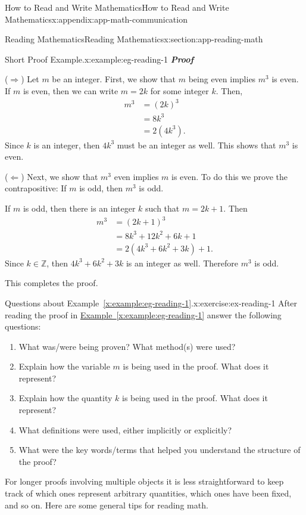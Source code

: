 \documentclass[oneside,10pt,]{book}
\newcommand{\xreffont}{\relax}
\newcommand{\alert}[1]{\textbf{\textit{#1}}}
\numberwithin{equation}{section}
\newcommand{\amp}{&}
\begin{document}
\begin{appendixptx}{How to Read and Write Mathematics}{}{How to Read and Write Mathematics}{}{}{x:appendix:app-math-communication}
\begin{sectionptx}{Reading Mathematics}{}{Reading Mathematics}{}{}{x:section:app-reading-math}
\begin{example}{Short Proof Example.}{x:example:eg-reading-1}
\alert{Proof}%
\par
(\(\Rightarrow\)) Let \(m\) be an integer. First, we show that \(m\) being even implies \(m^3\) is even. If \(m\) is even, then we can write \(m = 2k\) for some integer \(k\). Then,%
\begin{align*}
m^3 \amp = (2k)^3\\
\amp = 8k^3\\
\amp = 2(4k^3)\text{.}
\end{align*}
Since \(k\) is an integer, then \(4k^3\) must be an integer as well. This shows that \(m^3\) is even.%
\par
(\(\Leftarrow\)) Next, we show that \(m^3\) even implies \(m\) is even. To do this we prove the contrapositive: If \(m\) is odd, then \(m^3\) is odd.%
\par
If \(m\) is odd, then there is an integer \(k\) such that \(m = 2k + 1\). Then%
\begin{align*}
m^3 \amp = (2k+1)^3\\
\amp = 8k^3 + 12k^2 + 6k + 1\\
\amp = 2(4k^3 + 6k^2 + 3k) + 1\text{.}
\end{align*}
Since \(k \in \mathbb{Z}\), then \(4k^3 + 6k^2 + 3k\) is an integer as well. Therefore \(m^3\) is odd.%
\par
This completes the proof.%
\end{example}
\begin{inlineexercise}{Questions about Example~{\xreffont\ref*{x:example:eg-reading-1}}.}{x:exercise:ex-reading-1}%
After reading the proof in \hyperref[x:example:eg-reading-1]{Example~{\xreffont\ref{x:example:eg-reading-1}}} answer the following questions:%
\par
%
\begin{enumerate}
\item{}What was\slash{}were being proven? What method(s) were used?%
\item{}Explain how the variable \(m\) is being used in the proof. What does it represent?%
\item{}Explain how the quantity \(k\) is being used in the proof. What does it represent?%
\item{}What definitions were used, either implicitly or explicitly?%
\item{}What were the key words\slash{}terms that helped you understand the structure of the proof?%
\end{enumerate}
%
\end{inlineexercise}%
For longer proofs involving multiple objects it is less straightforward to keep track of which ones represent arbitrary quantities, which ones have been fixed, and so on. Here are some general tips for reading math.%

\end{sectionptx}
\end{appendixptx}
\end{document}
